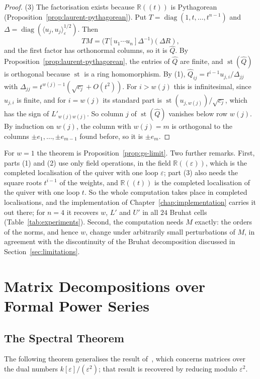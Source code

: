 \documentclass[12pt, a4paper]{report}
\theoremstyle{plain}
\theoremstyle{definition}
\theoremstyle{remark}
\theoremstyle{plain}
\newcommand{\RR}{\mathbb{R}}
\newcommand{\st}{\operatorname{st}}
\DeclareMathOperator{\diag}{diag}
\begin{document}
\begin{proof}
(3) The factorisation exists because $\RR((t))$ is Pythagorean (Proposition~\ref{prop:laurent-pythagorean}). Put $T=\diag(1,t,\dots,t^{n-1})$ and $\Delta=\diag(\langle u_j,u_j\rangle_\varepsilon^{1/2})$. Then
\[ TM=\bigl(T[u_1\cdots u_n]\Delta^{-1}\bigr)(\Delta R), \]
and the first factor has orthonormal columns, so it is $\hat Q$. By Proposition~\ref{prop:laurent-pythagorean}, the entries of $\hat Q$ are finite, and $\st(\hat Q)$ is orthogonal because $\st$ is a ring homomorphism. By (1), $\hat Q_{ij}=t^{i-1}u_{j,i}/\Delta_{jj}$ with $\Delta_{jj}=t^{w(j)-1}(\sqrt{c_j}+O(t^2))$. For $i>w(j)$ this is infinitesimal, since $u_{j,i}$ is finite, and for $i=w(j)$ its standard part is $\st(u_{j,w(j)})/\sqrt{c_j}$, which has the sign of $L'_{w(j)w(j)}$. So column $j$ of $\st(\hat Q)$ vanishes below row $w(j)$. By induction on $w(j)$, the column with $w(j)=m$ is orthogonal to the columns $\pm e_1,\dots,\pm e_{m-1}$ found before, so it is $\pm e_m$.
\end{proof}

For $w=1$ the theorem is Proposition~\ref{prop:gs-limit}. Two further remarks. First, parts (1) and (2) use only field operations, in the field $\RR((\varepsilon))$, which is the completed localisation of the quiver with one loop $\varepsilon$; part (3) also needs the square roots $t^{i-1}$ of the weights, and $\RR((t))$ is the completed localisation of the quiver with one loop $t$. So the whole computation takes place in completed localisations, and the implementation of Chapter~\ref{chap:implementation} carries it out there; for $n=4$ it recovers $w$, $L'$ and $U'$ in all $24$ Bruhat cells (Table~\ref{tab:experiments}). Second, the computation needs $M$ exactly: the orders of the norms, and hence $w$, change under arbitrarily small perturbations of $M$, in agreement with the discontinuity of the Bruhat decomposition discussed in Section~\ref{sec:limitations}.

\section{Matrix Decompositions over Formal Power Series}
\label{sec:power-series}

\subsection{The Spectral Theorem}
The following theorem generalises the result of~\cite{Gutin2022DualNumbers}, which concerns matrices over the dual numbers $k[\varepsilon]/(\varepsilon^2)$; that result is recovered by reducing modulo $\varepsilon^2$.
\end{document}
